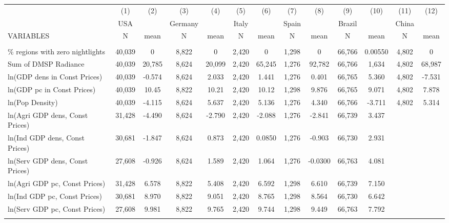 \begin{tabular}{lcccccccccccc} \hline
 & (1) & (2) & (3) & (4) & (5) & (6) & (7) & (8) & (9) & (10) & (11) & (12) \\
 & USA &  & Germany &  & Italy &  & Spain &  & Brazil &  & China &  \\
VARIABLES & N & mean & N & mean & N & mean & N & mean & N & mean & N & mean \\ \hline
 &  &  &  &  &  &  &  &  &  &  &  &  \\
\% regions with zero nightlights & 40,039 & 0 & 8,822 & 0 & 2,420 & 0 & 1,298 & 0 & 66,766 & 0.00550 & 4,802 & 0 \\
Sum of DMSP Radiance & 40,039 & 20,785 & 8,624 & 20,099 & 2,420 & 65,245 & 1,276 & 92,782 & 66,766 & 1,634 & 4,802 & 68,987 \\
ln(GDP dens in Const Prices) & 40,039 & -0.574 & 8,624 & 2.033 & 2,420 & 1.441 & 1,276 & 0.401 & 66,765 & 5.360 & 4,802 & -7.531 \\
ln(GDP pc in Const Prices) & 40,039 & 10.45 & 8,822 & 10.21 & 2,420 & 10.12 & 1,298 & 9.876 & 66,765 & 9.071 & 4,802 & 7.878 \\
ln(Pop Density) & 40,039 & -4.115 & 8,624 & 5.637 & 2,420 & 5.136 & 1,276 & 4.340 & 66,766 & -3.711 & 4,802 & 5.314 \\
ln(Agri GDP dens, Const Prices) & 31,428 & -4.490 & 8,624 & -2.790 & 2,420 & -2.088 & 1,276 & -2.841 & 66,739 & 3.437 &  &  \\
ln(Ind GDP dens, Const Prices) & 30,681 & -1.847 & 8,624 & 0.873 & 2,420 & 0.0850 & 1,276 & -0.903 & 66,730 & 2.931 &  &  \\
ln(Serv GDP dens, Const Prices) & 27,608 & -0.926 & 8,624 & 1.589 & 2,420 & 1.064 & 1,276 & -0.0300 & 66,763 & 4.081 &  &  \\
ln(Agri GDP pc, Const Prices) & 31,428 & 6.578 & 8,822 & 5.408 & 2,420 & 6.592 & 1,298 & 6.610 & 66,739 & 7.150 &  &  \\
ln(Ind GDP pc, Const Prices) & 30,681 & 8.970 & 8,822 & 9.051 & 2,420 & 8.765 & 1,298 & 8.564 & 66,730 & 6.642 &  &  \\
ln(Serv GDP pc, Const Prices) & 27,608 & 9.981 & 8,822 & 9.765 & 2,420 & 9.744 & 1,298 & 9.449 & 66,763 & 7.792 &  &  \\
 &  &  &  &  &  &  &  &  &  &  &  &  \\ \hline
\end{tabular}
